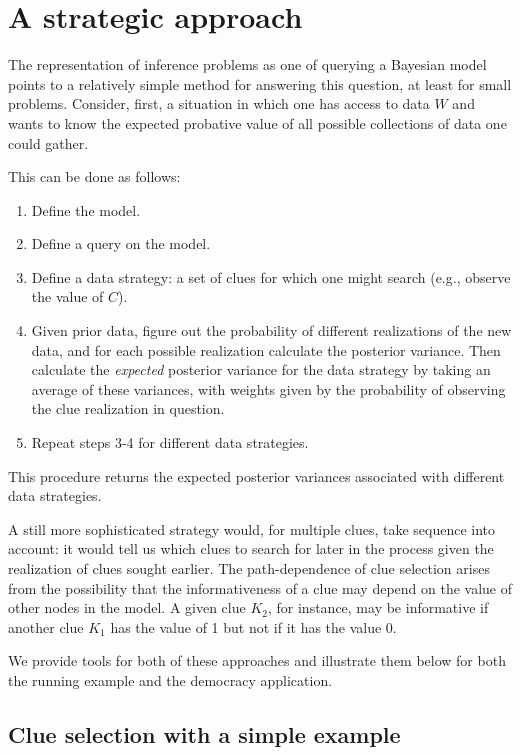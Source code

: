 \documentclass[
  12pt,
]{book}
\providecommand{\tightlist}{%
  \setlength{\itemsep}{0pt}\setlength{\parskip}{0pt}}
\begin{document}
\hypertarget{a-strategic-approach}{%
\section{A strategic approach}\label{a-strategic-approach}}

The representation of inference problems as one of querying a Bayesian model points to a relatively simple method for answering this question, at least for small problems. Consider, first, a situation in which one has access to data \(W\) and wants to know the expected probative value of all possible collections of data one could gather.

This can be done as follows:

\begin{enumerate}
\def\labelenumi{\arabic{enumi}.}
\tightlist
\item
  Define the model.
\item
  Define a query on the model.
\item
  Define a data strategy: a set of clues for which one might search (e.g., observe the value of \(C\)).
\item
  Given prior data, figure out the probability of different realizations of the new data, and for each possible realization calculate the posterior variance. Then calculate the \emph{expected} posterior variance for the data strategy by taking an average of these variances, with weights given by the probability of observing the clue realization in question.
\item
  Repeat steps 3-4 for different data strategies.
\end{enumerate}

This procedure returns the expected posterior variances associated with different data strategies.

A still more sophisticated strategy would, for multiple clues, take sequence into account: it would tell us which clues to search for later in the process given the realization of clues sought earlier. The path-dependence of clue selection arises from the possibility that the informativeness of a clue may depend on the value of other nodes in the model. A given clue \(K_2\), for instance, may be informative if another clue \(K_1\) has the value of 1 but not if it has the value 0.

We provide tools for both of these approaches and illustrate them below for both the running example and the democracy application.

\hypertarget{clue-selection-with-a-simple-example}{%
\subsection{Clue selection with a simple example}\label{clue-selection-with-a-simple-example}}
\end{document}
